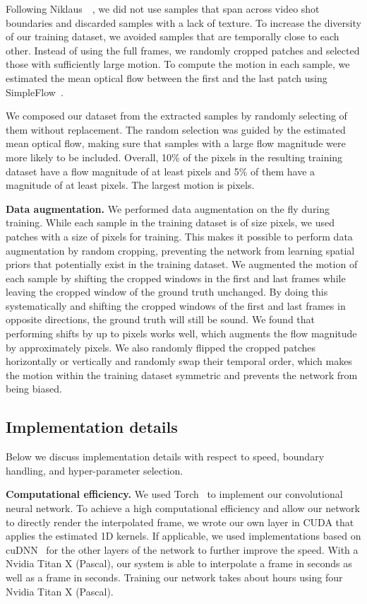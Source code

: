 \documentclass[10pt,twocolumn,letterpaper]{article}
\begin{document}
Following Niklaus~\etal~\cite{Niklaus_CVPR_2017}, we did not use samples that span across video shot boundaries and discarded samples with a lack of texture. To increase the diversity of our training dataset, we avoided samples that are temporally close to each other. Instead of using the full frames, we randomly cropped  patches and selected those with sufficiently large motion. To compute the motion in each sample, we estimated the mean optical flow between the first and the last patch using SimpleFlow~\cite{Tao_OTHER_2012}.

We composed our dataset from the extracted samples by randomly selecting  of them without replacement. The random selection was guided by the estimated mean optical flow, making sure that samples with a large flow magnitude were more likely to be included. Overall, 10\% of the pixels in the resulting training dataset have a flow magnitude of at least  pixels and 5\% of them have a magnitude of at least  pixels. The largest motion is  pixels.

\vspace{0.05in}
\noindent\textbf{Data augmentation.}
We performed data augmentation on the fly during training. While each sample in the training dataset is of size  pixels, we used patches with a size of  pixels for training. This makes it possible to perform data augmentation by random cropping, preventing the network from learning spatial priors that potentially exist in the training dataset. We augmented the motion of each sample by shifting the cropped windows in the first and last frames while leaving the cropped window of the ground truth unchanged. By doing this systematically and shifting the cropped windows of the first and last frames in opposite directions, the ground truth will still be sound. We found that performing shifts by up to  pixels works well, which augments the flow magnitude by approximately  pixels. We also randomly flipped the cropped patches horizontally or vertically and randomly swap their temporal order, which makes the motion within the training dataset symmetric and prevents the network from being biased.

\subsection{Implementation details}

Below we discuss implementation details with respect to speed, boundary handling, and hyper-parameter selection.

\vspace{0.05in}
\noindent\textbf{Computational efficiency.}
We used Torch~\cite{Collobert_OTHER_2011} to implement our convolutional neural network. To achieve a high computational efficiency and allow our network to directly render the interpolated frame, we wrote our own layer in CUDA that applies the estimated 1D kernels. If applicable, we used implementations based on cuDNN~\cite{Chetlur_CORR_2014} for the other layers of the network to further improve the speed. With a Nvidia Titan X (Pascal), our system is able to interpolate a  frame in  seconds as well as a  frame in  seconds. Training our network takes about  hours using four Nvidia Titan X (Pascal).
\end{document}
